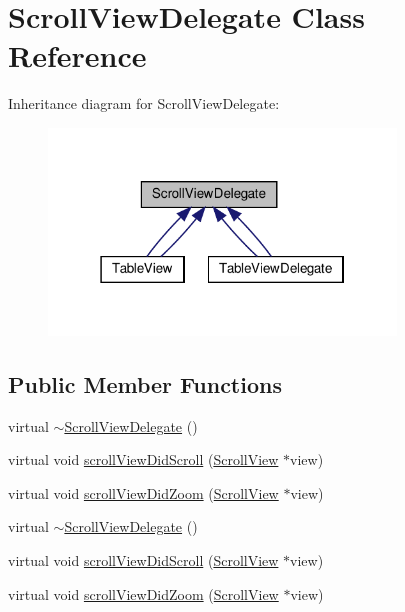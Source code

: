 \hypertarget{classScrollViewDelegate}{}\section{Scroll\+View\+Delegate Class Reference}
\label{classScrollViewDelegate}


Inheritance diagram for Scroll\+View\+Delegate\+:
\nopagebreak
\begin{figure}[H]
\begin{center}
\leavevmode
\includegraphics[width=262pt]{classScrollViewDelegate__inherit__graph}
\end{center}
\end{figure}
\subsection*{Public Member Functions}
\begin{DoxyCompactItemize}
\item 
virtual \hyperlink{classScrollViewDelegate_a770e3bdd5d16c6499818689346e920ea}{$\sim$\+Scroll\+View\+Delegate} ()
\item 
virtual void \hyperlink{classScrollViewDelegate_acdb3346314b9769c08add984a2abe0f8}{scroll\+View\+Did\+Scroll} (\hyperlink{classScrollView}{Scroll\+View} $\ast$view)
\item 
virtual void \hyperlink{classScrollViewDelegate_a442695e2f1b1d9ee3959a0a5e8d1bd03}{scroll\+View\+Did\+Zoom} (\hyperlink{classScrollView}{Scroll\+View} $\ast$view)
\item 
virtual \hyperlink{classScrollViewDelegate_a770e3bdd5d16c6499818689346e920ea}{$\sim$\+Scroll\+View\+Delegate} ()
\item 
virtual void \hyperlink{classScrollViewDelegate_acdb3346314b9769c08add984a2abe0f8}{scroll\+View\+Did\+Scroll} (\hyperlink{classScrollView}{Scroll\+View} $\ast$view)
\item 
virtual void \hyperlink{classScrollViewDelegate_a442695e2f1b1d9ee3959a0a5e8d1bd03}{scroll\+View\+Did\+Zoom} (\hyperlink{classScrollView}{Scroll\+View} $\ast$view)
\end{DoxyCompactItemize}


